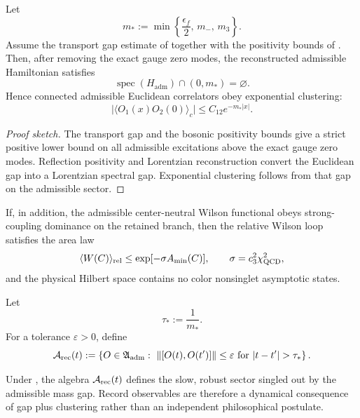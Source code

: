 
\begin{theorem}
\label{thm:nonperturbative-admissible-qft}
Let
\[
m_*:=\min\left\{\frac{\epsilon_f}{2},\,m_-,\,m_3\right\}.
\]
Assume the transport gap estimate of  together with the positivity bounds of . Then, after removing the exact gauge zero modes, the reconstructed admissible Hamiltonian satisfies
\[
\operatorname{spec}(H_{\mathrm{adm}})\cap(0,m_*)=\varnothing.
\]
Hence connected admissible Euclidean correlators obey exponential clustering:
\[
\bigl|\langle O_1(x)O_2(0)\rangle_c\bigr|
\le
C_{12}e^{-m_*|x|}.
\]
\end{theorem}

\begin{proof}[Proof sketch]
The transport gap and the bosonic positivity bounds give a strict positive lower bound on all admissible excitations above the exact gauge zero modes. Reflection positivity and Lorentzian reconstruction convert the Euclidean gap into a Lorentzian spectral gap. Exponential clustering follows from that gap on the admissible sector.
\end{proof}

\begin{conjecture}
If, in addition, the admissible center-neutral Wilson functional obeys strong-coupling dominance on the retained branch, then the relative Wilson loop satisfies the area law
\[
\langle W(C)\rangle_{\mathrm{rel}}
\le
\exp[-\sigma A_{\min}(C)],
\qquad
\sigma=c_3^2\chi_{\mathrm{QCD}}^2,
\]
and the physical Hilbert space contains no color nonsinglet asymptotic states.
\end{conjecture}

\begin{definition}
\label{def:stable-record-algebra}
Let
\[
\tau_*:=\frac{1}{m_*}.
\]
For a tolerance $\varepsilon>0$, define
\[
\Arec(t)
:=
\left\{
O\in\mathfrak A_{\mathrm{adm}}
:\ \|[O(t),O(t')]\|\le\varepsilon
\text{ for } |t-t'|>\tau_*
\right\}.
\]
\end{definition}

\begin{proposition}
Under , the algebra $\mathcal A_{\mathrm{rec}}(t)$ defines the slow, robust sector singled out by the admissible mass gap. Record observables are therefore a dynamical consequence of gap plus clustering rather than an independent philosophical postulate.
\end{proposition}

